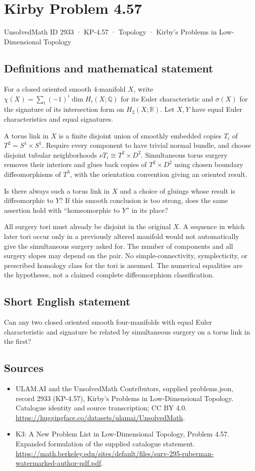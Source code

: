 \documentclass[11pt,a4paper]{article}
\begin{document}
\section*{Kirby Problem 4.57}\label{2933}
{\small UnsolvedMath ID 2933 · KP-4.57 · Topology · Kirby's Problems in Low-Dimensional Topology}
\subsection{Definitions and mathematical statement}
For a closed oriented smooth $4$-manifold $X$, write
$\chi(X)=\sum_i(-1)^i\dim H_i(X;\mathbb Q)$ for its Euler
characteristic and $\sigma(X)$ for the signature of its intersection
form on $H_2(X;\mathbb R)$. Let $X,Y$ have equal Euler
characteristics and equal signatures.

A torus link in $X$ is a finite disjoint union of smoothly embedded
copies $T_i$ of $T^2=S^1\times S^1$. Require every component to
have trivial normal bundle, and choose disjoint tubular neighborhoods
$\nu T_i\cong T^2\times D^2$. Simultaneous torus surgery removes
their interiors and glues back copies of $T^2\times D^2$ using
chosen boundary diffeomorphisms of $T^3$, with the orientation
convention giving an oriented result.

Is there always such a torus link in $X$ and a choice of gluings
whose result is diffeomorphic to $Y$? If this smooth conclusion is
too strong, does the same assertion hold with ``homeomorphic to $Y$''
in its place?

All surgery tori must already be disjoint in the original $X$.
A sequence in which later tori occur only in a previously altered
manifold would not automatically give the simultaneous surgery asked
for. The number of components and all surgery slopes may depend on
the pair. No simple-connectivity, symplecticity, or prescribed homology
class for the tori is assumed. The numerical equalities are the
hypotheses, not a claimed complete diffeomorphism classification.
\subsection{Short English statement}
Can any two closed oriented smooth four-manifolds with equal Euler characteristic and signature be related by simultaneous surgery on a torus link in the first?
\subsection{Sources}
\begin{itemize}
\item[S1] ULAM.AI and the UnsolvedMath Contributors, supplied problems.json, record 2933 (KP-4.57), Kirby's Problems in Low-Dimensional Topology. Catalogue identity and source transcription; CC BY 4.0.
\url{https://huggingface.co/datasets/ulamai/UnsolvedMath}.
\item[S2] K3: A New Problem List in Low-Dimensional Topology, Problem 4.57. Expanded formulation of the supplied catalogue statement.
\url{https://math.berkeley.edu/sites/default/files/surv-295-ruberman-watermarked-author-pdf.pdf}.
\end{itemize}
\end{document}
